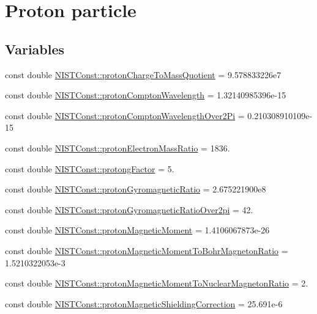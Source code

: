 \hypertarget{group___proton}{}\section{Proton particle}
\label{group___proton}
\subsection*{Variables}
\begin{DoxyCompactItemize}
\item 
const double \hyperlink{group___proton_ga59d127bca4ef5416e0e42c4d05c35a68}{N\+I\+S\+T\+Const\+::proton\+Charge\+To\+Mass\+Quotient} = 9.\+578833226e7
\item 
const double \hyperlink{group___proton_ga79247734bd6f7409a382e17da7359680}{N\+I\+S\+T\+Const\+::proton\+Compton\+Wavelength} = 1.\+32140985396e-\/15
\item 
const double \hyperlink{group___proton_gaedddad375441d4bf1013089ba0004da5}{N\+I\+S\+T\+Const\+::proton\+Compton\+Wavelength\+Over2\+Pi} = 0.\+210308910109e-\/15
\item 
const double \hyperlink{group___proton_gae88fb4c421a252321d15b0f93ad19954}{N\+I\+S\+T\+Const\+::proton\+Electron\+Mass\+Ratio} = 1836.
\item 
const double \hyperlink{group___proton_gafdc26fffabee1319028bd7f61d561be5}{N\+I\+S\+T\+Const\+::protong\+Factor} = 5.
\item 
const double \hyperlink{group___proton_ga5e708f58aaae8033705f05bc13507873}{N\+I\+S\+T\+Const\+::proton\+Gyromagnetic\+Ratio} = 2.\+675221900e8
\item 
const double \hyperlink{group___proton_ga54ecf0d1090a1b2c9f7b301add8904b0}{N\+I\+S\+T\+Const\+::proton\+Gyromagnetic\+Ratio\+Over2pi} = 42.
\item 
const double \hyperlink{group___proton_ga931c9d53a62cee8eb68b4e930d0cf5a6}{N\+I\+S\+T\+Const\+::proton\+Magnetic\+Moment} = 1.\+4106067873e-\/26
\item 
const double \hyperlink{group___proton_gab71f8e2de250b48e9bbac602b69999de}{N\+I\+S\+T\+Const\+::proton\+Magnetic\+Moment\+To\+Bohr\+Magneton\+Ratio} = 1.\+5210322053e-\/3
\item 
const double \hyperlink{group___proton_gae8cd4187eb7069a37639787bf4b1305a}{N\+I\+S\+T\+Const\+::proton\+Magnetic\+Moment\+To\+Nuclear\+Magneton\+Ratio} = 2.
\item 
const double \hyperlink{group___proton_ga401cef12f93ba64cca44703bbdb516e7}{N\+I\+S\+T\+Const\+::proton\+Magnetic\+Shielding\+Correction} = 25.\+691e-\/6

\end{DoxyCompactItemize}
